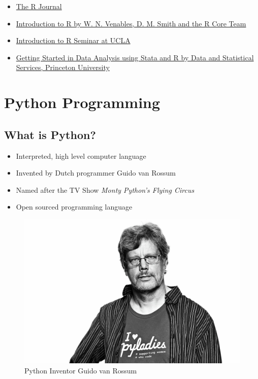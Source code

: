 \documentclass[]{book}
\providecommand{\tightlist}{%
  \setlength{\itemsep}{0pt}\setlength{\parskip}{0pt}}
\begin{document}
\begin{itemize}
\tightlist
\item
  \href{http://journal.r-project.org/}{The R Journal}
\item
  \href{http://cran.r-project.org/doc/manuals/R-intro.pdf}{Introduction to R by W. N. Venables, D. M. Smith and the R Core Team}
\item
  \href{http://www.ats.ucla.edu/stat/r/seminars/intro.htm}{Introduction to R Seminar at UCLA}
\item
  \href{https://dss.princeton.edu/training/}{Getting Started in Data Analysis using Stata and R by Data and Statistical Services, Princeton University}
\end{itemize}

\hypertarget{python-programming}{%
\chapter{Python Programming}\label{python-programming}}

\hypertarget{what-is-python}{%
\section{What is Python?}\label{what-is-python}}

\begin{itemize}
\tightlist
\item
  Interpreted, high level computer language
\item
  Invented by Dutch programmer Guido van Rossum
\item
  Named after the TV Show \emph{Monty Python's Flying Circus}
\item
  Open sourced programming language
\end{itemize}

\begin{figure}

\hfill{}\includegraphics[width=0.5\linewidth]{Pythoninventor} 

\caption{Python Inventor Guido van Rossum}\label{fig:Pythoninventor}
\end{figure}
\end{document}
